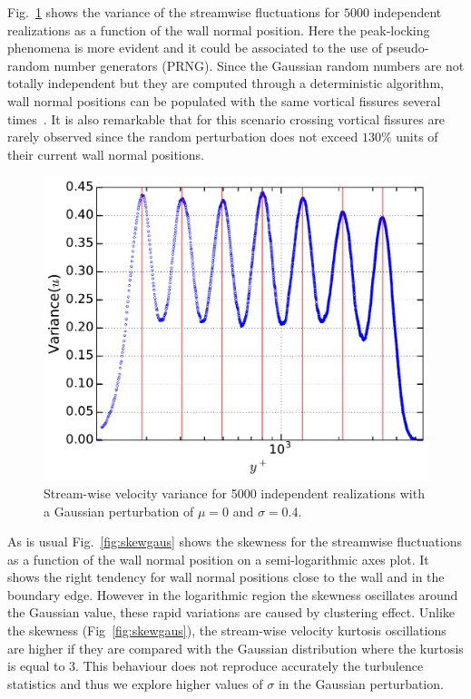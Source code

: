 \documentclass[aps,reprint,amsmath,amssymb,pra]{revtex4-1}%
\begin{document}
Fig.~\ref{fig:varigaus} shows the variance of the streamwise fluctuations for $5000$ independent realizations as a function of the wall normal position. Here the peak-locking phenomena is more evident and it could be associated to the use of pseudo-random number generators (PRNG). Since the Gaussian random numbers are not totally independent but they are computed through a deterministic algorithm, wall normal positions can be populated with the same vortical fissures several times~\cite{nm}. It is also remarkable that for this scenario crossing vortical fissures are rarely observed since the random perturbation does not exceed $130\%$ units of their current wall normal positions. 

\begin{figure}[b]
\includegraphics[scale=0.46]{figures/variance_5000_assembles}
\caption{\label{fig:varigaus} Stream-wise velocity variance for 5000 independent realizations with a Gaussian perturbation of $\mu=0$ and $\sigma=0.4$.}
\end{figure}
As is usual Fig.~\ref{fig:skewgaus} shows the skewness for the streamwise fluctuations as a function of the wall normal position on a semi-logarithmic axes plot. It shows the right tendency for wall normal positions close to the wall and in the boundary edge. However in the logarithmic region the skewness oscillates around the Gaussian value, these
rapid variations are caused by clustering effect. Unlike the skewness (Fig~\ref{fig:skewgaus}), the stream-wise velocity kurtosis oscillations are higher if they are compared with the Gaussian distribution where the kurtosis is equal to 3. This behaviour does not reproduce accurately the turbulence statistics and thus we explore higher values of $\sigma$ in the Gaussian perturbation.\\
\end{document}

